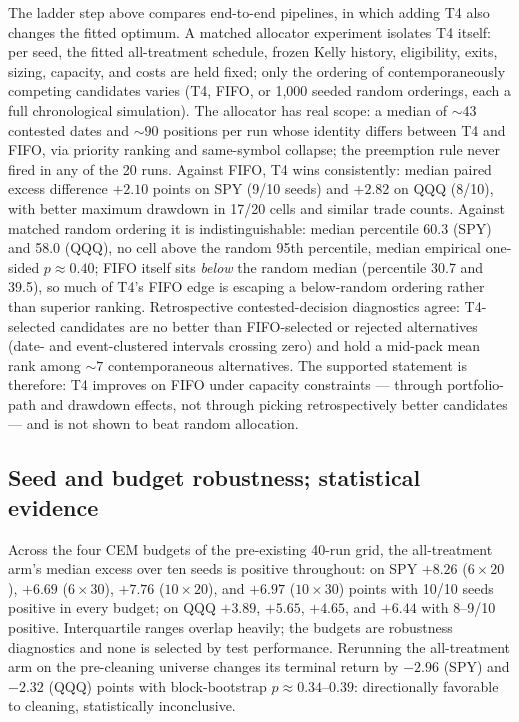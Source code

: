 \documentclass[sigconf,anonymous]{acmart}
\begin{document}
The ladder step above compares end-to-end pipelines, in which adding T4 also changes the fitted optimum. A matched allocator experiment isolates T4 itself: per seed, the fitted all-treatment schedule, frozen Kelly history, eligibility, exits, sizing, capacity, and costs are held fixed; only the ordering of contemporaneously competing candidates varies (T4, FIFO, or 1,000 seeded random orderings, each a full chronological simulation). The allocator has real scope: a median of ${\sim}43$ contested dates and ${\sim}90$ positions per run whose identity differs between T4 and FIFO, via priority ranking and same-symbol collapse; the preemption rule never fired in any of the 20 runs. Against FIFO, T4 wins consistently: median paired excess difference $+2.10$ points on SPY (9/10 seeds) and $+2.82$ on QQQ (8/10), with better maximum drawdown in 17/20 cells and similar trade counts. Against matched random ordering it is indistinguishable: median percentile 60.3 (SPY) and 58.0 (QQQ), no cell above the random 95th percentile, median empirical one-sided $p\approx0.40$; FIFO itself sits \emph{below} the random median (percentile 30.7 and 39.5), so much of T4's FIFO edge is escaping a below-random ordering rather than superior ranking. Retrospective contested-decision diagnostics agree: T4-selected candidates are no better than FIFO-selected or rejected alternatives (date- and event-clustered intervals crossing zero) and hold a mid-pack mean rank among ${\sim}7$ contemporaneous alternatives. The supported statement is therefore: T4 improves on FIFO under capacity constraints --- through portfolio-path and drawdown effects, not through picking retrospectively better candidates --- and is not shown to beat random allocation.

\subsection{Seed and budget robustness; statistical evidence}

Across the four CEM budgets of the pre-existing 40-run grid, the all-treatment arm's median excess over ten seeds is positive throughout: on SPY $+8.26$ ($6{\times}20$), $+6.69$ ($6{\times}30$), $+7.76$ ($10{\times}20$), and $+6.97$ ($10{\times}30$) points with 10/10 seeds positive in every budget; on QQQ $+3.89$, $+5.65$, $+4.65$, and $+6.44$ with 8--9/10 positive. Interquartile ranges overlap heavily; the budgets are robustness diagnostics and none is selected by test performance. Rerunning the all-treatment arm on the pre-cleaning universe changes its terminal return by $-2.96$ (SPY) and $-2.32$ (QQQ) points with block-bootstrap $p\approx0.34$--$0.39$: directionally favorable to cleaning, statistically inconclusive.
\end{document}
